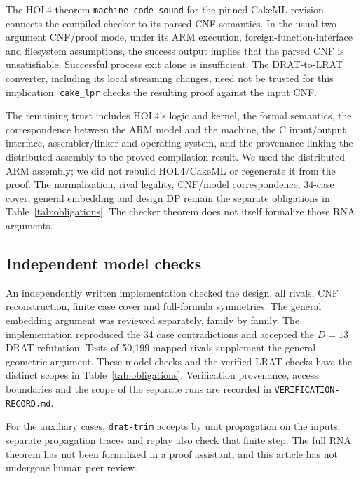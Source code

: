 \documentclass[11pt,a4paper]{article}
\theoremstyle{definition}
\begin{document}
The HOL4 theorem \texttt{machine\_code\_sound} for the pinned CakeML
revision connects the compiled checker to its parsed CNF semantics.
In the usual two-argument CNF/proof mode, under its ARM execution,
foreign-function-interface and filesystem assumptions, the success
output implies that the parsed CNF is unsatisfiable. Successful process
exit alone is insufficient. The DRAT-to-LRAT converter, including its
local streaming changes, need not be trusted for this implication:
\texttt{cake\_lpr} checks the resulting proof against the input CNF.

The remaining trust includes HOL4's logic and kernel, the formal
semantics, the correspondence between the ARM model and the machine,
the C input/output interface, assembler/linker and operating system,
and the provenance linking the distributed assembly to the proved
compilation result. We used the distributed ARM assembly; we did not
rebuild HOL4/CakeML or regenerate it from the proof. The normalization,
rival legality, CNF/model correspondence, 34-case cover, general
embedding and design DP remain the separate obligations in
Table~\ref{tab:obligations}. The checker theorem does not itself
formalize those RNA arguments.

\subsection{Independent model checks}
An independently written implementation checked the design, all rivals,
CNF reconstruction, finite case cover and full-formula symmetries.
The general embedding argument was reviewed separately, family by family. The implementation reproduced the 34 case contradictions and accepted the
$D=13$ DRAT refutation. Tests of 50,199 mapped rivals supplement the
general geometric argument. These model checks and the verified LRAT
checks have the distinct scopes in Table~\ref{tab:obligations}.
Verification provenance, access boundaries and the scope of the separate
runs are recorded in \texttt{VERIFICATION-RECORD.md}.

For the auxiliary cases, \texttt{drat-trim} accepts by unit propagation
on the inputs; separate propagation traces and replay also check that
finite step. The full RNA theorem has not been formalized in a proof
assistant, and this article has not undergone human peer review.
\end{document}
